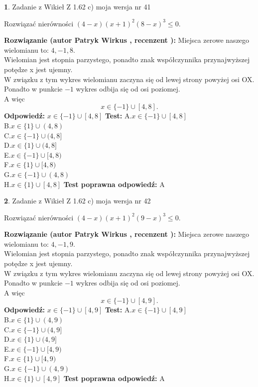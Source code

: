 \documentclass[12pt, a4paper]{article}
\theoremstyle{definition} %
\newtheorem{zad}{}
\newcommand{\zadStart}[1]{\begin{zad}#1\newline}
\newcommand{\zadStop}{\end{zad}}
\newcommand{\rozwStart}[2]{\noindent \textbf{Rozwiązanie (autor #1 , recenzent #2): }\newline}
\newcommand{\rozwStop}{\newline}
\newcommand{\odpStart}{\noindent \textbf{Odpowiedź:}\newline}
\newcommand{\odpStop}{\newline}
\newcommand{\testStart}{\noindent \textbf{Test:}\newline}
\newcommand{\testStop}{\newline}
\newcommand{\kluczStart}{\noindent \textbf{Test poprawna odpowiedź:}\newline}
\newcommand{\kluczStop}{\newline}
\begin{document}
\zadStart{Zadanie z Wikieł Z 1.62 c) moja wersja nr 41}

Rozwiązać nierówności $(4-x)(x+1)^{2}(8-x)^{3}\le0$.
\zadStop
\rozwStart{Patryk Wirkus}{}
Miejsca zerowe naszego wielomianu to: $4, -1, 8$.\\
Wielomian jest stopnia parzystego, ponadto znak współczynnika przy\linebreak najwyższej potędze x jest ujemny.\\ W związku z tym wykres wielomianu zaczyna się od lewej strony powyżej osi OX.\\
Ponadto w punkcie $-1$ wykres odbija się od osi poziomej.\\
A więc $$x \in \{-1\} \cup [4,8].$$
\rozwStop
\odpStart
$x \in \{-1\} \cup [4,8]$
\odpStop
\testStart
A.$x \in \{-1\} \cup [4,8]$\\
B.$x \in \{1\} \cup (4,8)$\\
C.$x \in \{-1\} \cup (4,8]$\\
D.$x \in \{1\} \cup (4,8]$\\
E.$x \in \{-1\} \cup [4,8)$\\
F.$x \in \{1\} \cup [4,8)$\\
G.$x \in \{-1\} \cup (4,8)$\\
H.$x \in \{1\} \cup [4,8]$
\testStop
\kluczStart
A
\kluczStop



\zadStart{Zadanie z Wikieł Z 1.62 c) moja wersja nr 42}

Rozwiązać nierówności $(4-x)(x+1)^{2}(9-x)^{3}\le0$.
\zadStop
\rozwStart{Patryk Wirkus}{}
Miejsca zerowe naszego wielomianu to: $4, -1, 9$.\\
Wielomian jest stopnia parzystego, ponadto znak współczynnika przy\linebreak najwyższej potędze x jest ujemny.\\ W związku z tym wykres wielomianu zaczyna się od lewej strony powyżej osi OX.\\
Ponadto w punkcie $-1$ wykres odbija się od osi poziomej.\\
A więc $$x \in \{-1\} \cup [4,9].$$
\rozwStop
\odpStart
$x \in \{-1\} \cup [4,9]$
\odpStop
\testStart
A.$x \in \{-1\} \cup [4,9]$\\
B.$x \in \{1\} \cup (4,9)$\\
C.$x \in \{-1\} \cup (4,9]$\\
D.$x \in \{1\} \cup (4,9]$\\
E.$x \in \{-1\} \cup [4,9)$\\
F.$x \in \{1\} \cup [4,9)$\\
G.$x \in \{-1\} \cup (4,9)$\\
H.$x \in \{1\} \cup [4,9]$
\testStop
\kluczStart
A
\kluczStop
\end{document}
